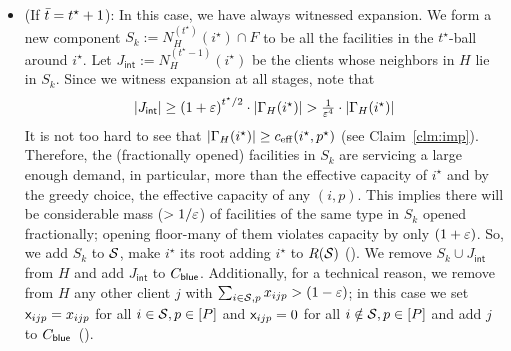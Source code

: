 \begin{itemize}
\item (If $\bar{t} =  t^\star + 1$):  In this case, we have always witnessed expansion. We form a new component  $S_k := N^{(t^\star)}_H(i^\star)\cap F$ to be all the facilities in the $t^\star$-ball around $i^\star$.
Let $J_\mathsf{int} := N^{(t^\star-1)}_H(i^\star)$ be the clients whose neighbors in $H$ lie in $S_k$. Since we witness expansion at all stages, note that 
\[\textstyle |J_\mathsf{int}| \geq \left(1+\varepsilon\right)^{t^\star/2}\cdot |\Gamma_H(i^\star)| > \frac{1}{\varepsilon^4}\cdot |\Gamma_H(i^\star)|\]
It is not too hard to see that $|\Gamma_H(i^\star)| \ge c_{\mathrm{eff}}(i^\star,p^\star)$ (see Claim~\ref{clm:imp}).
Therefore, the  (fractionally opened) facilities in $S_k$ are servicing a large enough demand, in particular, more than the effective capacity of $i^\star$ and by the greedy choice, the effective capacity of any $(i,p)$.
This implies there will be considerable mass ($>1/\varepsilon$)  of facilities of the same type in $S_k$ opened fractionally; opening floor-many of them violates capacity by only $(1+\varepsilon)$. 
So, we add $S_k$ to ${\cal S}$, make $i^\star$ its root adding $i^\star$ to $R({\cal S})$  (). We remove $S_k \cup J_\mathsf{int}$ from $H$ and add $J_\mathsf{int}$ to $C_{\mathsf{blue}}$. Additionally, for a technical reason, we remove from $H$ any other client $j$
with $\sum_{i\in {\cal S}, p} x_{ijp} > (1-\varepsilon)$; in this case we set ${\mathsf x}_{ijp} = x_{ijp}$ for all $i\in {\cal S}, p\in [P]$ and ${\mathsf x}_{ijp} = 0$ for all $i\notin {\cal S}, p\in [P]$ and add $j$ to $C_{\mathsf{blue}}$~(). 
%
%

\end{itemize}
